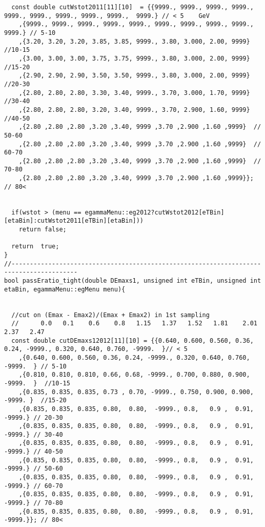 \begin{lstlisting}
  const double cutWstot2011[11][10]  = {{9999., 9999., 9999., 9999., 9999., 9999., 9999., 9999., 9999.,  9999.} // < 5    GeV
	,{9999., 9999., 9999., 9999., 9999., 9999., 9999., 9999., 9999.,  9999.} // 5-10   
	,{3.20, 3.20, 3.20, 3.85, 3.85, 9999., 3.80, 3.000, 2.00, 9999} //10-15
	,{3.00, 3.00, 3.00, 3.75, 3.75, 9999., 3.80, 3.000, 2.00, 9999} //15-20
	,{2.90, 2.90, 2.90, 3.50, 3.50, 9999., 3.80, 3.000, 2.00, 9999} //20-30
	,{2.80, 2.80, 2.80, 3.30, 3.40, 9999., 3.70, 3.000, 1.70, 9999} //30-40
	,{2.80, 2.80, 2.80, 3.20, 3.40, 9999., 3.70, 2.900, 1.60, 9999} //40-50
	,{2.80 ,2.80 ,2.80 ,3.20 ,3.40, 9999 ,3.70 ,2.900 ,1.60 ,9999}  // 50-60 
	,{2.80 ,2.80 ,2.80 ,3.20 ,3.40, 9999 ,3.70 ,2.900 ,1.60 ,9999}  // 60-70   
	,{2.80 ,2.80 ,2.80 ,3.20 ,3.40, 9999 ,3.70 ,2.900 ,1.60 ,9999}  // 70-80   
	,{2.80 ,2.80 ,2.80 ,3.20 ,3.40, 9999 ,3.70 ,2.900 ,1.60 ,9999}};   // 80<   
  

  if(wstot > (menu == egammaMenu::eg2012?cutWstot2012[eTBin][etaBin]:cutWstot2011[eTBin][etaBin]))
    return false;
  
  return  true;
}
//----------------------------------------------------------------------------------------
bool passEratio_tight(double DEmaxs1, unsigned int eTBin, unsigned int etaBin, egammaMenu::egMenu menu){
  
  
  //cut on (Emax - Emax2)/(Emax + Emax2) in 1st sampling 
  //      0.0   0.1    0.6    0.8   1.15   1.37   1.52   1.81    2.01   2.37   2.47
  const double cutDEmaxs12012[11][10] = {{0.640, 0.600, 0.560, 0.36, 0.24, -9999., 0.320, 0.640, 0.760, -9999.  }// < 5  
	,{0.640, 0.600, 0.560, 0.36, 0.24, -9999., 0.320, 0.640, 0.760, -9999.  } // 5-10
	,{0.810, 0.810, 0.810, 0.66, 0.68, -9999., 0.700, 0.880, 0.900, -9999.  }  //10-15 
	,{0.835, 0.835, 0.835, 0.73 , 0.70, -9999., 0.750, 0.900, 0.900, -9999. }  //15-20 
	,{0.835, 0.835, 0.835, 0.80,  0.80,  -9999., 0.8,   0.9 ,  0.91,  -9999.} // 20-30 
	,{0.835, 0.835, 0.835, 0.80,  0.80,  -9999., 0.8,   0.9 ,  0.91,  -9999.} // 30-40
	,{0.835, 0.835, 0.835, 0.80,  0.80,  -9999., 0.8,   0.9 ,  0.91,  -9999.} // 40-50
	,{0.835, 0.835, 0.835, 0.80,  0.80,  -9999., 0.8,   0.9 ,  0.91,  -9999.} // 50-60 
	,{0.835, 0.835, 0.835, 0.80,  0.80,  -9999., 0.8,   0.9 ,  0.91,  -9999.} // 60-70
	,{0.835, 0.835, 0.835, 0.80,  0.80,  -9999., 0.8,   0.9 ,  0.91,  -9999.} // 70-80
	,{0.835, 0.835, 0.835, 0.80,  0.80,  -9999., 0.8,   0.9 ,  0.91,  -9999.}}; // 80<
  

\end{lstlisting}
